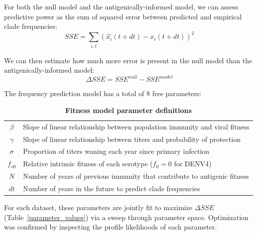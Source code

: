 For both the null model and the antigenically-informed model, we can assess predictive power as the sum of squared error between predicted and empirical clade frequencies:
\begin{equation}
  \label{eq_sse}
SSE = \sum_{i,t} \left( \hat{x_i}(t+dt) - x_{i}(t+dt) \right)^2
\end{equation}

We can then estimate how much more error is present in the null model than the antigenically-informed model:
\begin{equation}
  \label{eq_delta_sse}
\Delta SSE = SSE^{null} - SSE^{model}
\end{equation}

The frequency prediction model has a total of 8 free parameters:
\begin{centering}
\begin{table}[ht!]
    \caption[Fitness model parameter definitions]{\textbf{Fitness model parameter definitions}}
    \begin{tabular}{c|l}
      $\beta$ & Slope of linear relationship between population immunity and viral fitness\\
      $\gamma$ & Slope of linear relationship between titers and probability of protection\\
      $\sigma$ & Proportion of titers waning each year since primary infection\\
      $f_{s0}$ & Relative intrinsic fitness of each serotype ($f_0 = 0$ for DENV4)\\
      $N$ & Number of years of previous immunity that contribute to antigenic fitness\\
      $dt$ & Number of years in the future to predict clade frequencies\\
    \end{tabular}
    \label{parameter_definition}
\end{table}
\end{centering}

For each dataset, these parameters are jointly fit to maximize $\Delta SSE$ (Table~\ref{parameter_values}) via a sweep through parameter space.
Optimization was confirmed by inspecting the profile likelihoods of each parameter.





\appendix
\raggedbottom\sloppy

